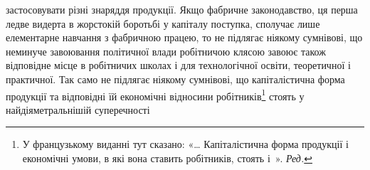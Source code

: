 застосовувати різні знаряддя продукції. Якщо фабричне законодавство,
ця перша ледве видерта в жорстокій боротьбі у капіталу
поступка, сполучає лише елементарне навчання з фабричною працею,
то не підлягає ніякому сумнівові, що неминуче завоювання
політичної влади робітничою клясою завоює також відповідне
місце в робітничих школах і для технологічної освіти, теоретичної
і практичної. Так само не підлягає ніякому сумнівові, що
капіталістична форма продукції та відповідні їй економічні відносини
робітників\footnote*{
У французькому виданні тут сказано: «\dots{} Капіталістична форма
продукції і економічні умови, в які вона ставить робітників, стоять
і~». \emph{Ред.}
} стоять у найдіяметральнішій суперечності
\parbreak{}  %
